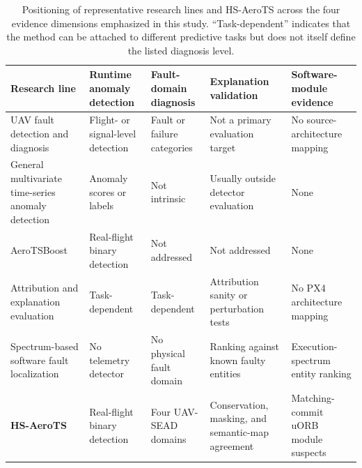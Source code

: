 \begin{table}[H]
\caption{Positioning of representative research lines and HS-AeroTS across the four evidence dimensions emphasized in this study. ``Task-dependent'' indicates that the method can be attached to different predictive tasks but does not itself define the listed diagnosis level.}
\label{tab:related_work_positioning}
\centering
\footnotesize
\renewcommand{\arraystretch}{1.18}
\begin{tabularx}{\textwidth}{>{\RaggedRight\arraybackslash}p{3.0cm} >{\RaggedRight\arraybackslash}p{2.35cm} >{\RaggedRight\arraybackslash}p{2.25cm} >{\RaggedRight\arraybackslash}p{2.55cm} >{\RaggedRight\arraybackslash}X}
\toprule
\textbf{Research line} & \textbf{Runtime anomaly detection} & \textbf{Fault-domain diagnosis} & \textbf{Explanation validation} & \textbf{Software-module evidence} \\
\midrule
UAV fault detection and diagnosis \cite{fourlas2021survey,puchalski2022uav,keipour2021alfa} & Flight- or signal-level detection & Fault or failure categories & Not a primary evaluation target & No source-architecture mapping \\
General multivariate time-series anomaly detection \cite{su2019omnianomaly,deng2021gdn,tuli2022tranad} & Anomaly scores or labels & Not intrinsic & Usually outside detector evaluation & None \\
AeroTSBoost \cite{wei2026aerotsboost} & Real-flight binary detection & Not addressed & Not addressed & None \\
Attribution and explanation evaluation \cite{bento2021timeshap,adebayo2018sanity,hooker2019benchmark} & Task-dependent & Task-dependent & Attribution sanity or perturbation tests & No PX4 architecture mapping \\
Spectrum-based software fault localization \cite{jones2002visualization,wong2016survey,pearson2017evaluating} & No telemetry detector & No physical fault domain & Ranking against known faulty entities & Execution-spectrum entity ranking \\
\textbf{HS-AeroTS} & Real-flight binary detection & Four UAV-SEAD domains & Conservation, masking, and semantic-map agreement & Matching-commit uORB module suspects \\
\bottomrule
\end{tabularx}
\end{table}
